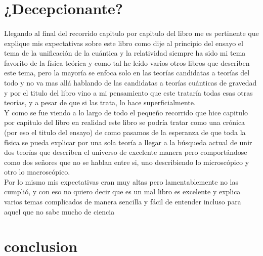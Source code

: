 \documentclass[12pt]{article}
\begin{document}
\section*{¿Decepcionante?}
\paragraph*{}
\textsf{Llegando al final del recorrido capitulo por capitulo del libro me es pertinente que explique mis expectativas sobre este libro
como dije al principio del ensayo el tema de la unificación de la cuántica y la relatividad siempre ha sido mi tema favorito
de la física teórica y como tal he leído varios otros libros que describen este tema, pero la mayoría se enfoca solo en las teorías
candidatas a teorías del todo y no va mas allá hablando de las candidatas a teorías cuánticas de gravedad y por el titulo del libro
vino a mi pensamiento que este trataría todas esas otras teorías, y a pesar de que si las trata, lo hace superficialmente.\\
Y como se fue viendo a lo largo de todo el pequeño recorrido que hice capitulo por capitulo del libro en realidad este libro se 
podría tratar como una crónica (por eso el titulo del ensayo) de como pasamos de la esperanza de que toda la física se pueda
explicar por una sola teoría a llegar a la búsqueda actual de unir dos teorías que describen el universo de excelente manera
pero comportándose como dos señores que no se hablan entre si, uno describiendo lo microscópico y otro lo macroscópico.\\
Por lo mismo mis expectativas eran muy altas pero lamentablemente no las cumplió, y 
con eso no quiero decir que es un mal libro es excelente y explica varios temas complicados de manera sencilla y fácil de entender
incluso para aquel que no sabe mucho de ciencia }
\section*{conclusion}
\end{document}

